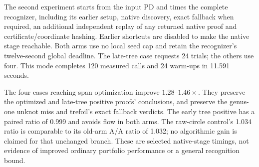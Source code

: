 The second experiment starts from the input PD and times the complete
recognizer, including its earlier setup, native discovery, exact fallback
when required, an additional independent replay of any returned native
proof and certificate/coordinate hashing. Earlier shortcuts are disabled
to make the native stage reachable. Both arms use no local seed cap and
retain the recognizer's twelve-second global deadline. The late-tree
case requests 24 trials; the others use four. This mode completes 120
measured calls and 24 warm-ups in 11.591 seconds.

\begin{center}
\small
\end{center}

The four cases reaching span optimization improve $1.28$--$1.46\times$.
They preserve the optimized and late-tree positive proofs' conclusions,
and preserve the genus-one unknot miss and trefoil's exact fallback
verdicts. The early tree positive has a paired ratio of 0.999 and avoids
flow in both arms. The raw-circle control's 1.034 ratio is comparable to
its old-arm A/A ratio of 1.032; no algorithmic gain is claimed for that
unchanged branch. These are selected native-stage timings, not evidence
of improved ordinary portfolio performance or a general recognition bound.
